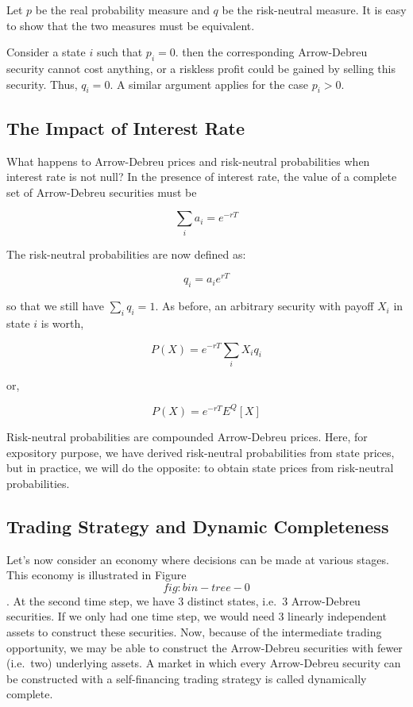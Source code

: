 \documentclass[justified]{tufte-book}
\begin{document}
Let \(p\) be the real probability measure and \(q\) be the risk-neutral
measure. It is easy to show that the two measures must be equivalent.

Consider a state \(i\) such that \(p_i = 0\). then the corresponding
Arrow-Debreu security cannot cost anything, or a riskless profit could
be gained by selling this security. Thus, \(q_i=0\). A similar argument
applies for the case \(p_i>0\).

\hypertarget{the-impact-of-interest-rate}{%
\subsection{The Impact of Interest Rate}\label{the-impact-of-interest-rate}}

What happens to Arrow-Debreu prices and risk-neutral probabilities when
interest rate is not null? In the presence of interest rate, the value
of a complete set of Arrow-Debreu securities must be

\[\sum_i a_i = e^{-rT}\]

The risk-neutral probabilities are now defined as:

\[q_i = a_i e^{rT}\]

so that we still have \(\sum_i q_i = 1\). As before, an arbitrary security
with payoff \(X_i\) in state \(i\) is worth,

\[P(X) = e^{-rT} \sum_i X_i q_i\]

or,

\[P(X) = e^{-rT} E^Q[X]\]

Risk-neutral probabilities are compounded Arrow-Debreu prices. Here, for
expository purpose, we have derived risk-neutral probabilities from
state prices, but in practice, we will do the opposite: to obtain state
prices from risk-neutral probabilities.

\hypertarget{trading-strategy-and-dynamic-completeness}{%
\subsection{Trading Strategy and Dynamic Completeness}\label{trading-strategy-and-dynamic-completeness}}

Let's now consider an economy where decisions can be made at various
stages. This economy is illustrated in Figure~\[fig:bin-tree-0\]. At the
second time step, we have 3 distinct states, i.e.~3 Arrow-Debreu
securities. If we only had one time step, we would need 3 linearly
independent assets to construct these securities. Now, because of the
intermediate trading opportunity, we may be able to construct the
Arrow-Debreu securities with fewer (i.e.~two) underlying assets. A
market in which every Arrow-Debreu security can be constructed with a
self-financing trading strategy is called dynamically complete.
\end{document}
